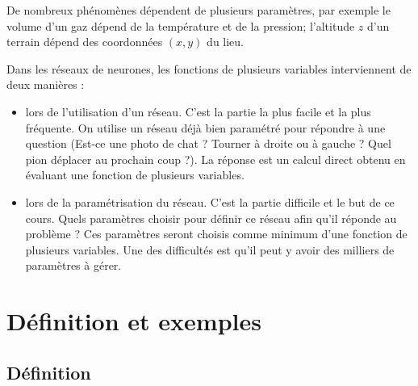 \documentclass[11pt,class=report,crop=false]{standalone}
\begin{document}





De nombreux phénomènes dépendent de plusieurs paramètres, par exemple le volume d'un gaz dépend de la température et de la pression; l'altitude $z$ d'un terrain dépend des coordonnées $(x,y)$ du lieu.

Dans les réseaux de neurones, les fonctions de plusieurs variables interviennent de deux manières :
\begin{itemize}
  \item lors de l'utilisation d'un réseau. C'est la partie la plus facile et la plus fréquente. On utilise un réseau déjà bien paramétré pour répondre à une question (Est-ce une photo de chat ? Tourner à droite ou à gauche ? Quel pion déplacer au prochain coup ?). La réponse est un calcul direct obtenu en évaluant une fonction de plusieurs variables. 
  
  \item lors de la paramétrisation du réseau. C'est la partie difficile et le but de ce cours. Quels paramètres choisir pour définir ce réseau afin qu'il réponde au problème ? Ces paramètres seront choisis comme minimum d'une fonction de plusieurs variables. Une des difficultés est qu'il peut y avoir des milliers de paramètres à gérer.
  
\end{itemize}




\section{Définition et exemples}

\subsection{Définition}
\end{document}
